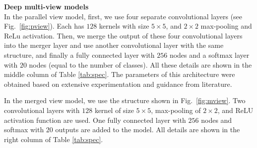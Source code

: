 \documentclass{article}
\begin{document}
\noindent
\textbf{Deep multi-view models}\\
In the parallel view model, first, we use four separate convolutional layers (see Fig.~\ref{fig:pview}). Each has $128$ kernels with size $5 \times 5$, and $2\times 2$ max-pooling and ReLu activation. Then, we merge the output of these four convolutional layers into the merger layer and use another convolutional layer with the same structure, and finally a fully connected layer with $256$ nodes and a softmax layer with $20$ nodes (equal to the number of classes). All these details are shown in the middle column of Table \ref{tab:spec}. The parameters of this architecture were obtained based on extensive experimentation and guidance from literature.

In the merged view model, we use the structure shown in Fig.~\ref{fig:mview}. Two convolutional layers with $128$ kernel of size $5\times 5$, max-pooling of $2\times2$, and ReLU activation function are used. One fully connected layer with $256$ nodes and softmax with $20$ outputs are added to the model. All details are shown in the right column of Table \ref{tab:spec}.
\end{document}
